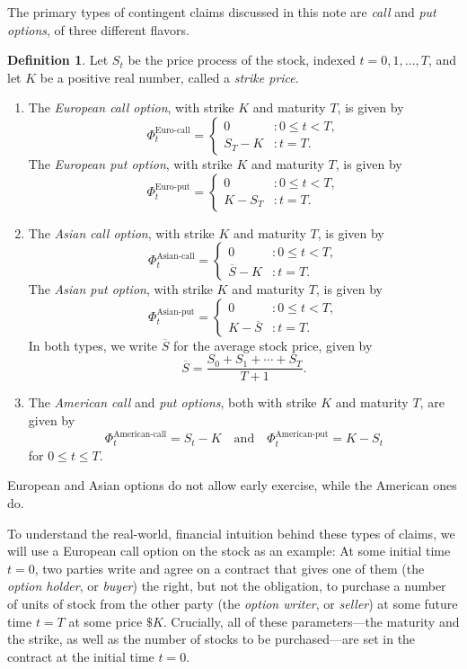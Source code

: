 \documentclass[reqno]{amsart}
\theoremstyle{definition}
\newtheorem{defn}[thm]{Definition}
\numberwithin{equation}{section}
\begin{document}
The primary types of contingent claims discussed in this note are \textit{call} and \textit{put options}, of three different flavors.

\begin{defn}\label{defn:options}
Let $S_t$ be the price process of the stock, indexed $t=0,1,\ldots,T$, and let $K$ be a positive real number, called a \textit{strike price}.
\begin{enumerate}
\item The \textit{European call option}, with strike $K$ and maturity $T$, is given by
	\[
	\Phi^\text{Euro-call}_t = \begin{cases} 0 & : 0 \leq t < T, \\ S_T-K &: t=T.\end{cases}
	\]
The \textit{European put option}, with strike $K$ and maturity $T$, is given by
	\[
	\Phi^\text{Euro-put}_t = \begin{cases} 0 & : 0 \leq t < T, \\ K-S_T &: t=T.\end{cases}
	\]
\item The \textit{Asian call option}, with strike $K$ and maturity $T$, is given by
	\[
	\Phi^\text{Asian-call}_t = \begin{cases} 0 & : 0 \leq t < T, \\ \overline{S}-K &: t=T.\end{cases}
	\]
The \textit{Asian put option}, with strike $K$ and maturity $T$, is given by
	\[
	\Phi^\text{Asian-put}_t = \begin{cases} 0 & : 0 \leq t < T, \\  K-\overline{S} &: t=T.\end{cases}
	\]
In both types, we write $\overline{S}$ for the average stock price, given by
	\[
	\overline{S} = \frac{S_0+S_1+\cdots + S_T}{T+1}.
	\]
\item The \textit{American call} and \textit{put options}, both with strike $K$ and maturity $T$, are given by
	\[
	\Phi^\text{American-call}_t = S_t-K \quad \text{and} \quad \Phi^\text{American-put}_t = K-S_t
	\]
for $0\leq t \leq T$.
\end{enumerate}
\end{defn}

European and Asian options do not allow early exercise, while the American ones do.

To understand the real-world, financial intuition behind these types of claims, we will use a European call option on the stock as an example: At some initial time $t=0$, two parties write and agree on a contract that gives one of them (the \textit{option holder}, or \textit{buyer}) the right, but not the obligation, to purchase a number of units of stock from the other party (the \textit{option writer}, or \textit{seller}) at some future time $t=T$ at some price $\$K$. Crucially, all of these parameters---the maturity and the strike, as well as the number of stocks to be purchased---are set in the contract at the initial time $t=0$.
\end{document}
